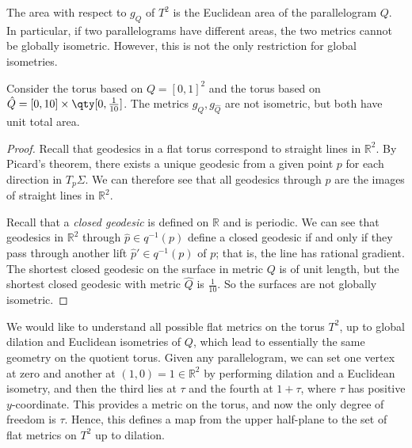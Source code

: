 The area with respect to $g_Q$ of $T^2$ is the Euclidean area of the parallelogram $Q$.
In particular, if two parallelograms have different areas, the two metrics cannot be globally isometric.
However, this is not the only restriction for global isometries.
\begin{lemma}
	Consider the torus based on $Q = [0,1]^2$ and the torus based on $\hat Q = [0,10] \times \qty[0,\frac{1}{10}]$.
	The metrics $g_Q, g_{\hat Q}$ are not isometric, but both have unit total area.
\end{lemma}
\begin{proof}
	Recall that geodesics in a flat torus correspond to straight lines in $\mathbb R^2$.
	By Picard's theorem, there exists a unique geodesic from a given point $p$ for each direction in $T_p \Sigma$.
	We can therefore see that all geodesics through $p$ are the images of straight lines in $\mathbb R^2$.

	Recall that a \textit{closed geodesic} is defined on $\mathbb R$ and is periodic.
	We can see that geodesics in $\mathbb R^2$ through $\hat p \in q^{-1}(p)$ define a closed geodesic if and only if they pass through another lift $\hat p' \in q^{-1}(p)$ of $p$; that is, the line has rational gradient.
	The shortest closed geodesic on the surface in metric $Q$ is of unit length, but the shortest closed geodesic with metric $\hat Q$ is $\frac{1}{10}$.
	So the surfaces are not globally isometric.
\end{proof}
We would like to understand all possible flat metrics on the torus $T^2$, up to global dilation and Euclidean isometries of $Q$, which lead to essentially the same geometry on the quotient torus.
Given any parallelogram, we can set one vertex at zero and another at $(1,0) = 1 \in \mathbb R^2$ by performing dilation and a Euclidean isometry, and then the third lies at $\tau$ and the fourth at $1 + \tau$, where $\tau$ has positive $y$-coordinate.
This provides a metric on the torus, and now the only degree of freedom is $\tau$.
Hence, this defines a map from the upper half-plane to the set of flat metrics on $T^2$ up to dilation.

